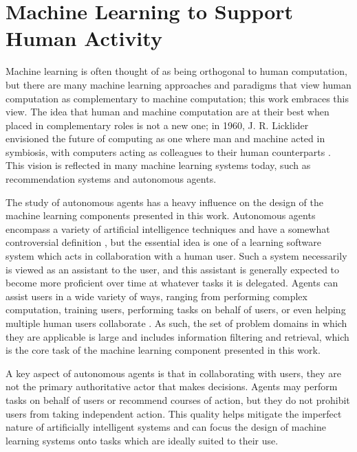 \section {Machine Learning to Support Human Activity}

Machine learning is often thought of as being orthogonal to human computation, but there are many machine learning approaches and paradigms that view human computation as complementary to machine computation; this work embraces this view.  The idea that human and machine computation are at their best when placed in complementary roles is not a new one; in 1960, J. R. Licklider envisioned the future of computing as one where man and machine acted in symbiosis, with computers acting as colleagues to their human counterparts \cite{licklider:symbiosis}.  This vision is reflected in many machine learning systems today, such as recommendation systems and autonomous agents.

The study of autonomous agents has a heavy influence on the design of the machine learning components presented in this work.  Autonomous agents encompass a variety of artificial intelligence techniques and have a somewhat controversial definition \cite{franklin:taxonomy}, but the essential idea is one of a learning software system which acts in collaboration with a human user.  Such a system necessarily is viewed as an assistant to the user, and this assistant is generally expected to become more proficient over time at whatever tasks it is delegated.  Agents can assist users in a wide variety of ways, ranging from performing complex computation, training users, performing tasks on behalf of users, or even helping multiple human users collaborate \cite{lieberman:agents, maes:agents}.  As such, the set of problem domains in which they are applicable is large and includes information filtering and retrieval, which is the core task of the machine learning component presented in this work.

A key aspect of autonomous agents is that in collaborating with users, they are not the primary authoritative actor that makes decisions.  Agents may perform tasks on behalf of users or recommend courses of action, but they do not prohibit users from taking independent action.  This quality helps mitigate the imperfect nature of artificially intelligent systems and can focus the design of machine learning systems onto tasks which are ideally suited to their use.

